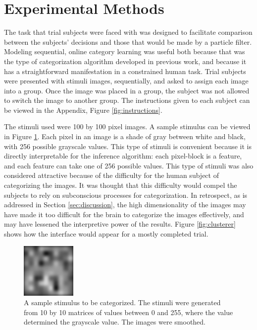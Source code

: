 \section{Experimental Methods}
\label{sec:experiment}
The task that trial subjects were faced with was designed to facilitate
comparison between the subjects' decisions and those that would be made by a
particle filter. Modeling sequential, online category learning was useful both
because that was the type of categorization algorithm developed in previous
work, and because it has a straightforward manifestation in a constrained human
task. Trial subjects were presented with stimuli images, sequentially, and asked
to assign each image into a group. Once the image was placed in a group, the
subject was not allowed to switch the image to another group. The instructions
given to each subject can be viewed in the Appendix, Figure
\ref{fig:instructions}.

The stimuli used were 100 by 100 pixel images. A sample
stimulus can be viewed in Figure \ref{fig:stimulus}. Each pixel in an
image is a shade of gray between white and black, with 256 possible grayscale
values. This type of stimuli is convenient because it is directly interpretable
for the inference algorithm: each pixel-block is a feature, and each feature can
take one of 256 possible values. This type of stimuli was also considered
attractive because of the difficulty for the human subject of categorizing the
images. It was thought that this difficulty would compel the subjects to rely on
subconscious processes for categorization. In retrospect, as is addressed in
Section \ref{sec:discussion}, the high dimensionality of the images may have
made it too difficult for the brain to categorize the images effectively, and
may have lessened the interpretive power of the results. Figure
\ref{fig:clusterer} shows how the interface would appear for a mostly completed trial.

\begin{figure}
\centering
\includegraphics[scale=1]{img/stimulus.png}
\caption{A sample stimulus to be categorized. The stimuli were generated from
  10 by 10 matrices of values between 0 and 255, where the value determined the
  grayscale value. The images were smoothed.}
\label{fig:stimulus}
\end{figure}

